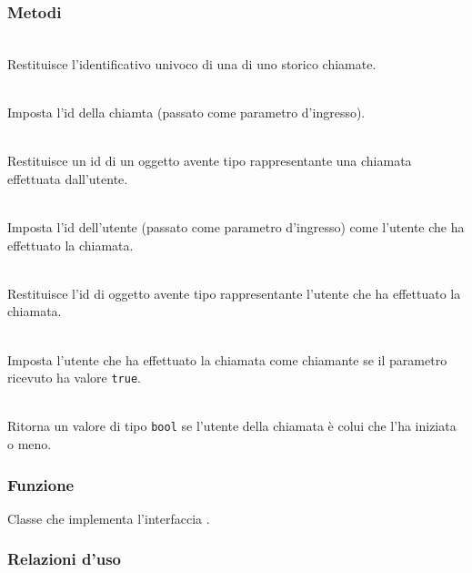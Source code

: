 \subsubsection*{Metodi}
\begin{description}
	\item{}\\
	Restituisce l'identificativo univoco di una  di uno storico chiamate.
	
	\item{}\\
	Imposta l'id della chiamta  (passato come parametro d'ingresso).
	\item{}\\
	Restituisce un id di un oggetto avente tipo  rappresentante una chiamata effettuata dall'utente.
	
	\item{}\\
	Imposta l'id dell'utente  (passato come parametro d'ingresso) come l'utente che ha effettuato la chiamata.
	\item{}\\
	Restituisce l'id di oggetto avente tipo  rappresentante l'utente che ha effettuato la chiamata.
	
	\item{}\\
	Imposta l'utente che ha effettuato la chiamata come chiamante se il parametro ricevuto ha valore \texttt{true}.
	\item{}\\
	Ritorna un valore di tipo \texttt{bool} se l'utente della chiamata è colui che l'ha iniziata o meno.
\end{description}





\subsubsection*{Funzione}
Classe che implementa l'interfaccia .

\subsubsection*{Relazioni d'uso}

